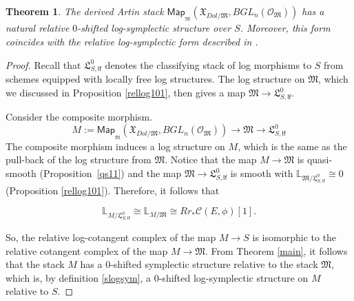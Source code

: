 \documentclass[11pt]{amsart}
\newcommand {\map} {\mathsf{Map}}
\theoremstyle{plain}
\numberwithin{equation}{section}
\theoremstyle{definition}
\theoremstyle{plain}
\newtheorem{Thm}[Def]{Theorem}
\begin{document}
\smallskip


\begin{Thm}\label{main112}
The derived Artin stack $\map_{_{\mathfrak M}}(\mathfrak{X}_{Dol/\mathfrak{M}}, BGL_n(\mathcal{O}_{\mathfrak M}))$ has a natural relative $0$-shifted log-symplectic structure over $S$. Moreover, this form coincides with the relative log-symplectic form described in \cite{D}.
\end{Thm}

\smallskip


\begin{proof}
Recall that $\mathfrak{L}^{0}_{S,\mathsf{lf}}$ denotes the classifying stack of log morphisms to $S$ from schemes equipped with locally free log structures. The log structure on $\mathfrak M$, which we discussed in Proposition \ref{rellog101}, then gives a map $\mathfrak M\to \mathfrak{L}^{0}_{S,\mathsf{lf}}$. 

Consider the composite morphism. 
\[
M:=\map_{_{\mathfrak M}}(\mathfrak{X}_{Dol/\mathfrak{M}}, BGL_n(\mathcal{O}_{\mathfrak M})) \longrightarrow \mathfrak M\longrightarrow \mathfrak{L}^{0}_{S,\mathsf{lf}}
\] 
The composite morphism induces a log structure on $M$, which is the same as the pull-back of the log structure from $\mathfrak M$. Notice that the map $M \to \mathfrak{M}$  is quasi-smooth (Proposition~\ref{qs11}) and the map 
$\mathfrak{M} \to \mathfrak{L}^{0}_{S,\mathsf{lf}}$ is smooth with $\mathbb L_{\mathfrak M/\mathfrak{L}^{0}_{S,\mathsf{lf}}}\cong 0$ (Proposition \ref{rellog101}). Therefore, it follows that 

\begin{equation}\label{TC112}
\mathbb L_{M/\mathfrak{L}^{0}_{S,\mathsf{lf}}}\cong \mathbb L_{M/\mathfrak M}\cong  Rr_*\mathcal C(E, \phi)[1].
\end{equation}

So, the relative log-cotangent complex of the map $M\longrightarrow S$ is isomorphic to the relative cotangent complex of the map $M\longrightarrow \mathfrak M$. From Theorem \ref{main}, it follows that the stack $M$ has a $0$-shifted symplectic structure relative to the stack $\mathfrak M$, which is, by definition \ref{slogsym}, a $0$-shifted log-symplectic structure on $M$ relative to $S$. 


\end{proof}
\end{document}
